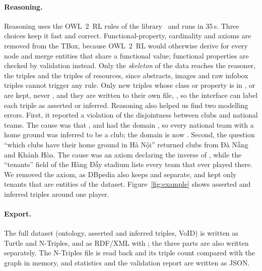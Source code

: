 \paragraph{Reasoning.}
\label{sec:reasoning}
Reasoning uses the OWL~2~RL rules of the 
library~\cite{motik2012owl2profiles, rdflib} and runs in 35\,s. Three choices
keep it fast and correct. Functional-property, cardinality and
 axioms are removed from the TBox, because OWL~2~RL would
otherwise derive  for every node and merge entities that
share a functional value; functional properties are checked by validation
instead. Only the \emph{skeleton} of the data reaches the reasoner, the
 triples and the  triples of  resources,
since abstracts, images and raw infobox triples cannot trigger any rule. Only
new triples whose class or property is in ,  or
 are kept, never , and they are written to their
own file, , so the interface can label each triple as
asserted or inferred.
Reasoning also helped us find two modelling errors. First, it reported a
violation of the disjointness between clubs and national teams. The cause was
that ,  and  had the
domain , so every national team with a home ground was
inferred to be a club; the domain is now . Second, the
question ``which clubs have their home ground in Hà Nội'' returned clubs from
Đà Nẵng and Khánh Hòa. The cause was an axiom declaring  the
inverse of , while the ``tenants'' field of the Hàng Đẫy
stadium lists every team that ever played there. We removed the axiom, as
DBpedia also keeps  and  separate, and kept
only tenants that are entities of the dataset. Figure~\ref{fig:example} shows
asserted and inferred triples around one player.

\paragraph{Export.} The full dataset (ontology, asserted and inferred triples,
VoID) is written as Turtle and N-Triples, and as RDF/XML with
; the three parts are also written separately. The N-Triples
file is read back and its triple count compared with the graph in memory, and
statistics and the validation report are written as JSON.

